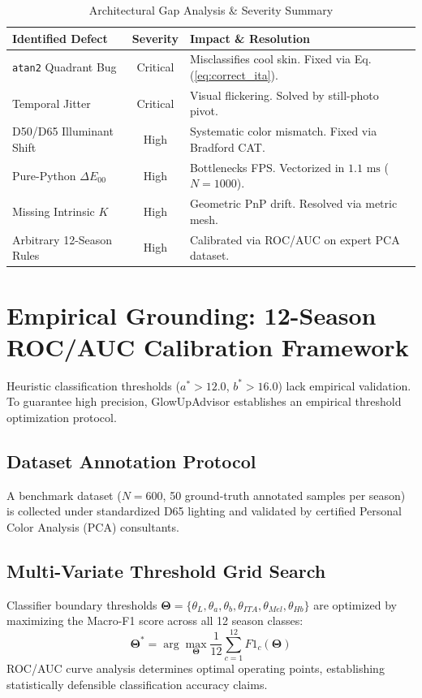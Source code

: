 \documentclass[conference]{IEEEtran}
\begin{document}
\begin{table}[htbp]
\caption{Architectural Gap Analysis \& Severity Summary}
\begin{center}
\begin{tabular}{l c p{4.2cm}}
\toprule
\textbf{Identified Defect} & \textbf{Severity} & \textbf{Impact \& Resolution} \\
\midrule
\texttt{atan2} Quadrant Bug & Critical & Misclassifies cool skin. Fixed via Eq. (\ref{eq:correct_ita}). \\
Temporal Jitter & Critical & Visual flickering. Solved by still-photo pivot. \\
D50/D65 Illuminant Shift & High & Systematic color mismatch. Fixed via Bradford CAT. \\
Pure-Python $\Delta E_{00}$ & High & Bottlenecks FPS. Vectorized in $1.1\text{ ms}$ ($N=1000$). \\
Missing Intrinsic $K$ & High & Geometric PnP drift. Resolved via metric mesh. \\
Arbitrary 12-Season Rules & High & Calibrated via ROC/AUC on expert PCA dataset. \\
\bottomrule
\end{tabular}
\label{tab:audit_summary}
\end{center}
\end{table}

\section{Empirical Grounding: 12-Season ROC/AUC Calibration Framework}
Heuristic classification thresholds ($a^* > 12.0$, $b^* > 16.0$) lack empirical validation. To guarantee high precision, GlowUpAdvisor establishes an empirical threshold optimization protocol.

\subsection{Dataset Annotation Protocol}
A benchmark dataset ($N = 600$, 50 ground-truth annotated samples per season) is collected under standardized D65 lighting and validated by certified Personal Color Analysis (PCA) consultants.

\subsection{Multi-Variate Threshold Grid Search}
Classifier boundary thresholds $\mathbf{\Theta} = \{\theta_{L}, \theta_{a}, \theta_{b}, \theta_{ITA}, \theta_{Mel}, \theta_{Hb}\}$ are optimized by maximizing the Macro-F1 score across all 12 season classes:
\begin{equation}
\mathbf{\Theta}^* = \arg\max_{\mathbf{\Theta}} \frac{1}{12} \sum_{c=1}^{12} F1_c(\mathbf{\Theta})
\end{equation}
ROC/AUC curve analysis determines optimal operating points, establishing statistically defensible classification accuracy claims.
\end{document}
